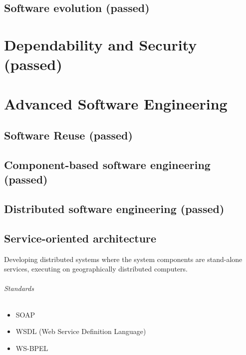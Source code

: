 \documentclass[a4paper,11pt,twocolumn]{report}
\begin{document}
    \chapter{Software evolution (passed)}


    \part{Dependability and Security (passed)}
    \addtocounter{chapter}{6}

    
    \part{Advanced Software Engineering}
    \chapter{Software Reuse (passed)}
    
    \chapter{Component-based software engineering (passed)}
    
    \chapter{Distributed software engineering (passed)}
    
    \chapter{Service-oriented architecture}
    Developing distributed systems where the system components are stand-alone
    services, executing on geographically distributed computers.
    \paragraph{Standards}
    \begin{itemize}
        \item SOAP
        \item WSDL (Web Service Definition Language)
        \item WS-BPEL 
    \end{itemize}
\end{document}
